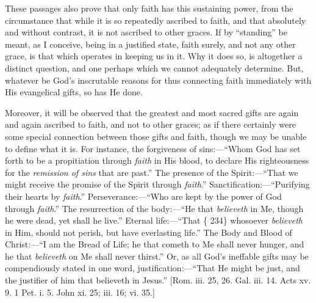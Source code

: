 These passages also prove that only faith has this sustaining
power, from the circumstance that while it is so repeatedly ascribed
to faith, and that absolutely and without contrast, it is not ascribed
to other graces. If by ``standing'' be meant, as I conceive,
being in a justified state, faith surely, and not any other grace, is
that which operates in keeping us in it. Why it does so, is altogether
a distinct question, and one perhaps which we cannot adequately
determine. But, whatever be God's inscrutable reasons for thus
connecting faith immediately with His evangelical gifts, so has He
done.

Moreover, it will be observed that the greatest and most sacred
gifts are again and again ascribed to faith, and not to other graces;
as if there certainly were some special connection between those gifts
and faith, though we may be unable to define what it is. For instance,
the forgiveness of sins:—``Whom God has set forth to be a
propitiation through \emph{faith} in His blood, to declare His
righteousness for the \emph{remission of sins} that are past.''
The presence of the Spirit:—``That we might receive the promise
of the Spirit through \emph{faith}.'' Sanctification:—``Purifying
their hearts by \emph{faith}.'' Perseverance:—``Who are kept
by the power of God through \emph{faith}.'' The resurrection of
the body:—``He that \emph{believeth} in Me, though he were dead,
yet shall he live.'' Eternal life:—``That \{ 234\} whosoever \emph{believeth}
in Him, should not perish, but have everlasting life.'' The Body
and Blood of Christ:—``I am the Bread of Life; he that cometh to
Me shall never hunger, and he that \emph{believeth} on Me shall never
thirst.'' Or, as all God's ineffable gifts may be compendiously
stated in one word, justification:—``That He might be just, and
the justifier of him that believeth in Jesus.'' [Rom. iii. 25, 26.
Gal. iii. 14. Acts xv. 9. 1 Pet. i. 5. John xi. 25; iii. 16; vi. 35.]

